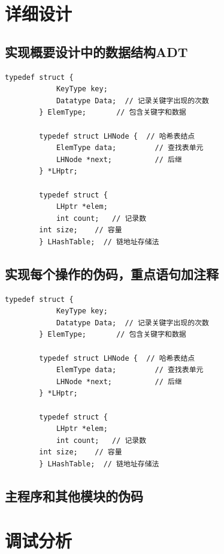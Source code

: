 \documentclass[a4paper]{article}
\begin{document}
    \section{详细设计}\label{sec:design2}

    \subsection{实现概要设计中的数据结构ADT}\label{subsec:adt2}
    \begin{lstlisting}[caption={},label={lst:lstlisting}]
        typedef struct {
            KeyType key;
            Datatype Data;  // 记录关键字出现的次数
        } ElemType;       // 包含关键字和数据

        typedef struct LHNode {  // 哈希表结点
            ElemType data;         // 查找表单元
            LHNode *next;          // 后继
        } *LHptr;

        typedef struct {
            LHptr *elem;
            int count;   // 记录数
        int size;    // 容量
        } LHashTable;  // 链地址存储法
    \end{lstlisting}

    \subsection{实现每个操作的伪码，重点语句加注释}\label{subsec:explain}
    \begin{lstlisting}[caption={},label={lst:lstlisting2}]
        typedef struct {
            KeyType key;
            Datatype Data;  // 记录关键字出现的次数
        } ElemType;       // 包含关键字和数据

        typedef struct LHNode {  // 哈希表结点
            ElemType data;         // 查找表单元
            LHNode *next;          // 后继
        } *LHptr;

        typedef struct {
            LHptr *elem;
            int count;   // 记录数
        int size;    // 容量
        } LHashTable;  // 链地址存储法
    \end{lstlisting}

    \subsection{主程序和其他模块的伪码}\label{subsec:code2}


    \section{调试分析}\label{sec:debug}
\end{document}
